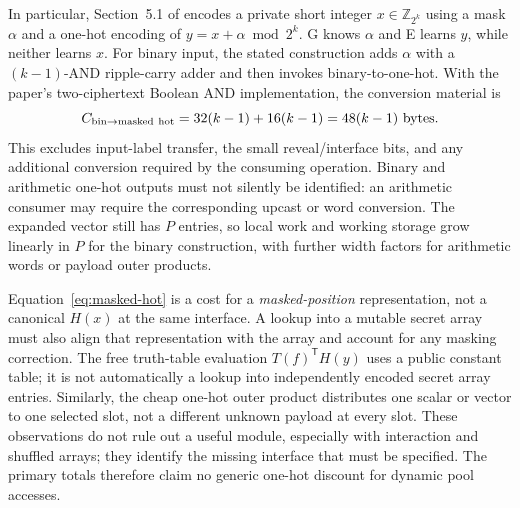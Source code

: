 \documentclass[11pt]{article}
\begin{document}
In particular, Section~5.1 of \cite{heath2024} encodes a private short integer
$x\in\mathbb Z_{2^k}$ using a mask $\alpha$ and a one-hot encoding of
$y=x+\alpha\bmod 2^k$.  G knows $\alpha$ and E learns $y$, while neither learns
$x$.  For binary input, the stated construction adds $\alpha$ with a
$(k-1)$-AND ripple-carry adder and then invokes binary-to-one-hot.  With the
paper's two-ciphertext Boolean AND implementation, the conversion material is
\begin{equation}
 C_{\rm bin\to masked\ hot}
 =32(k-1)+16(k-1)=48(k-1)\ \text{bytes}.
 \label{eq:masked-hot}
\end{equation}
This excludes input-label transfer, the small reveal/interface bits, and any
additional conversion required by the consuming operation.  Binary and
arithmetic one-hot outputs must not silently be identified: an arithmetic
consumer may require the corresponding upcast or word conversion.  The
expanded vector still has $P$ entries, so local work and working storage grow
linearly in $P$ for the binary construction, with further width factors for
arithmetic words or payload outer products.

Equation~\eqref{eq:masked-hot} is a cost for a \emph{masked-position}
representation, not a canonical $H(x)$ at the same interface.  A lookup into
a mutable secret array must also align that representation with the array
and account for any masking correction.  The free truth-table evaluation
$T(f)^\mathsf{T}H(y)$ uses a public constant table; it is not automatically a
lookup into independently encoded secret array entries.  Similarly, the cheap
one-hot outer product distributes one scalar or vector to one selected slot,
not a different unknown payload at every slot.  These observations do not
rule out a useful module, especially with interaction and shuffled arrays;
they identify the missing interface that must be specified.  The primary
totals therefore claim no generic one-hot discount for dynamic pool accesses.
\end{document}
